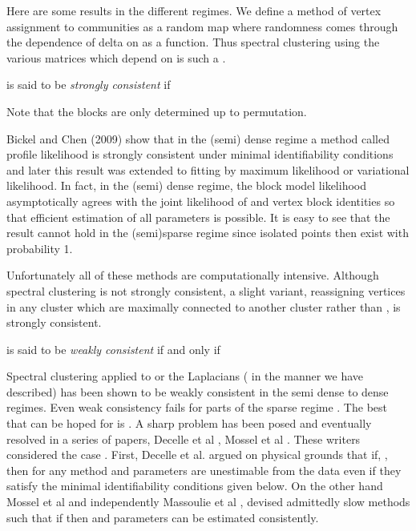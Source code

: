 \documentclass[graybox]{svmult}
\begin{document}
Here are some results in the different regimes. We define a method of vertex assignment  to communities  as a random map  where randomness comes through the dependence of delta on  as a function. Thus spectral clustering using  the various matrices  which depend on  is such a .

\begin{definition}
 is said to be \emph{strongly consistent} if 

\end{definition}
Note that  the blocks are only determined up to permutation.

Bickel and Chen (2009) \cite{bickel2009nonparametric} show that  in the (semi) dense regime a method called profile likelihood is strongly consistent  under minimal identifiability conditions and later this result was extended \cite{MR3127853} to fitting by maximum likelihood or variational likelihood. In fact, in the (semi) dense regime, the block model likelihood asymptotically agrees with the joint likelihood of   and vertex block identities so that efficient estimation of all parameters is possible. It is easy to see that the result cannot  hold in the (semi)sparse regime since  isolated points then exist with probability 1.

Unfortunately all of these methods are computationally  intensive. Although spectral clustering is not strongly consistent, a slight variant, reassigning vertices in any cluster  which are maximally connected to another cluster  rather than  , is strongly consistent.
\begin{definition}
 is said to be \emph{weakly consistent} if and only if 

\end{definition}

Spectral clustering applied  to   \cite{MR3010899} or the Laplacians (\cite{MR2893856} in the manner we have described) has been shown to be weakly consistent in the semi dense to dense regimes. Even weak consistency fails for parts of the sparse regime \cite{abbe2014exact}. The best that can be hoped for is . A sharp problem has been posed and eventually resolved  in a series of papers, Decelle et al \cite{decelle2011asymptotic}, Mossel et al \cite{mossel2013proof}. These writers considered the  case . First, Decelle  et al. \cite{decelle2011asymptotic} argued on physical grounds that if, , then    for any method  and parameters are unestimable from the data even if they satisfy the minimal identifiability conditions  given below. On the other hand  Mossel et al \cite{mossel2013proof} and independently  Massoulie et al \cite{massoulie2014community}, devised admittedly slow methods such that if  then  and parameters can be estimated consistently. 
\end{document}
